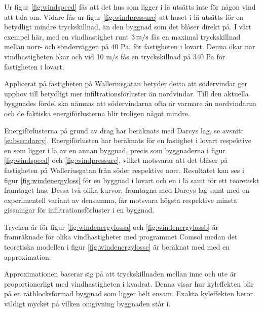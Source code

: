 Ur figur \ref{fig:windspeed} fås att det hus som ligger i lä utsätts inte för någon vind att tala om.
 Vidare fås ur figur \ref{fig:windpressure} att huset i lä utsätts för en betydligt mindre 
 tryckskillnad, än den byggnad som det blåser direkt på. I vårt exempel här, med en 
 vindhastighet runt $\unit[3]{m/s}$ fås en maximal tryckskillnad mellan norr- och sönderväggen 
 på 40 Pa, för fastigheten i lovart. Denna ökar när vindhastigheten ökar och vid 10 m/s fås en 
 tryckskillnad på 340 Pa för fastigheten i lovart. 

Applicerat på fastigheten på Walleriusgatan betyder detta att södervindar ger upphov till 
betydligt mer infiltrationsförluster än nordvindar. Till den aktuella byggnades fördel ska nämnas 
att södervindarna ofta är varmare än nordvindarna och de faktiska energiförlusterna blir 
troligen något mindre.


Energiförlusterna på grund av drag har beräknats med Darcys lag, se avsnitt \ref{subsec:darcy}. Energiförlusten har beräknats
  för en fastighet i lovart respektive en som ligger i lä av en annan byggnad, precis som 
  byggnaderna i figur \ref{fig:windspeed} och \ref{fig:windpressure}, vilket motsvarar att det 
  blåser på fastigheten på Walleriusgatan från söder respektive norr. Resultatet kan ses i figur 
  \ref{fig:windenergyloss} för en byggnad i lovart och en i lä samt för ett teoretiskt framtaget hus. Dessa två olika kurvor, framtagna med Darcys lag samt med en experimentell variant av densamma, får motsvara högsta respektive minsta gissningar för infiltrationsförluster i en byggnad.

Trycken är för figur \ref{fig:windenergylossa} och \ref{fig:windenergylossb} är framräknade för 
olika vindhastigheter med programmet Comsol medan det teoretiska modellen i figur 
\ref{fig:windenergylossc} är beräknat med med en approximation. 

Approximationen baserar sig
 på att tryckskillnaden mellan inne och ute är proportionerligt med vindhastigheten i kvadrat. Denna visar hur kyleffekten blir på en rätblocksformad byggnad som ligger helt ensam. Exakta kyleffekten beror väldigt mycket på vilken omgivning byggnaden står i.


